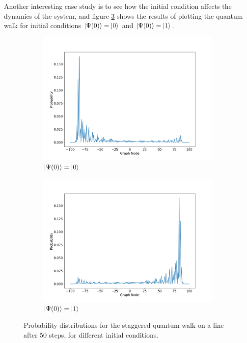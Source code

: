 \documentclass[../../dissertation.tex]{subfiles}
\begin{document}
Another interesting case study is to see how the initial condition affects the
dynamics of the system, and figure \ref{fig:stagQW2InitCond} shows the results
of plotting the quantum walk for initial conditions  $\ket{\Psi(0)}=\ket{0}$
and  $\ket{\Psi(0)}=\ket{1}$.
\begin{figure}[!h]
	\begin{subfigure}[h]{0.50\textwidth}
	\includegraphics[width=\linewidth]{img/StagQuantumWalk/stagqwSingle0.png}
	\caption{$\ket{\Psi(0)}=\ket{0}$}\label{fig:fig6}
	\end{subfigure}\hfill
	\begin{subfigure}[h]{0.50\textwidth}
	\includegraphics[width=\linewidth]{img/StagQuantumWalk/stagqwSingle1.png}
	\caption{$\ket{\Psi(0)}=\ket{1}$}\label{fig:fig7}
	\end{subfigure}\hfill
	\caption{Probability distributions for the staggered quantum walk on a line after 50 steps, for different initial conditions.}
	\label{fig:stagQW2InitCond}
\end{figure}
\end{document}
